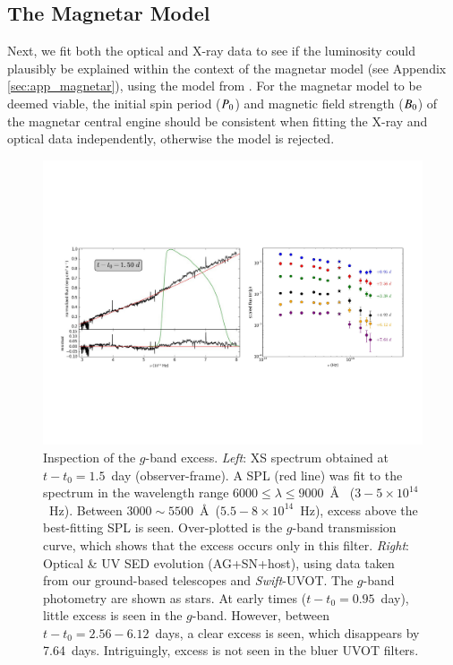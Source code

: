 \documentclass[traditabstract,longauth]{aa}
\begin{document}
\subsection{The Magnetar Model}

Next, we fit both the optical and X-ray data to see if the luminosity could plausibly be explained within the context of the magnetar model (see Appendix \ref{sec:app_magnetar}), using the model from \citet{CJM16}.  For the magnetar model to be deemed viable, the initial spin period ($P_{\rm 0}$) and magnetic field strength ($B_{\rm 0}$) of the magnetar central engine should be consistent when fitting the X-ray and optical data independently, otherwise the model is rejected.



\begin{figure}
   \centering  %
   \includegraphics[width=\hsize,  trim={0 0 0 0}]{Fig14_SED_g-eps-converted-to.pdf}
      \caption{Inspection of the $g$-band excess. \textit{Left}: XS spectrum obtained at $t-t_0=1.5$~day (observer-frame).  A SPL (red line) was fit to the spectrum in the wavelength range $6000 \le \lambda \le 9000$~\AA~ ($3-5\times10^{14}$~Hz).  Between $3000\sim5500$~\AA~($5.5-8\times10^{14}$~Hz), excess above the best-fitting SPL is seen.  Over-plotted is the $g$-band transmission curve, which shows that the excess occurs only in this filter.  \textit{Right}: Optical \& UV SED evolution (AG+SN+host), using data taken from our ground-based telescopes and \emph{Swift}-UVOT.  The $g$-band photometry are shown as stars.  At early times ($t-t_0=0.95$~day), little excess is seen in the $g$-band.  However, between $t-t_0 = 2.56-6.12$~days, a clear excess is seen, which disappears by 7.64~days.  Intriguingly, excess is not seen in the bluer UVOT filters. }
   \label{FiggSED}
\end{figure}
\end{document}
